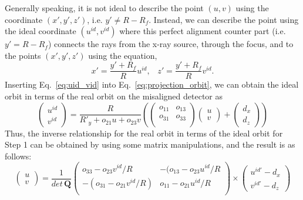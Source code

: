 Generally speaking, it is not ideal to describe the point $(u, v)$ using the coordinate $(x', y', z')$, i.e. $y' \neq R - R_f$.  Instead, we can describe the point using the ideal coordinate $(u^{id}, v^{id})$ where this perfect alignment counter part (i.e. $y' = R - R_f$) connects the rays from the x-ray source, through the focus, and to the points $(x', y', z')$ using the equation,
%
\begin{equation}
x' = \frac{y' + R_f}{R} u^{id}, \; \; \; z' = \frac{y' + R_f}{R} v^{id}.
\label{eq:uid_vid}
\end{equation}
%
Inserting Eq.~\ref{eq:uid_vid} into Eq.~\ref{eq:projection_orbit}, we can obtain the ideal orbit in terms of the real orbit on the misaligned detector as
%
\begin{equation}
\begin{pmatrix}
u^{id} \\
v^{id} 
\end{pmatrix} = \frac{R}{R'_y + o_{21}u + o_{23} v} 
\left(
\begin{pmatrix}
o_{11} & o_{13} \\
o_{31} & o_{33} \\
\end{pmatrix} 
\begin{pmatrix}
u \\
v
\end{pmatrix} + 
\begin{pmatrix}
d_x \\
d_z
\end{pmatrix}
\right)
\label{eq:ideal_orbit_matrix}
\end{equation}
%
Thus, the inverse relationship for the real orbit in terms of the ideal orbit for Step 1 can be obtained by using some matrix manipulations, and the result is as follows:
%
\begin{equation}
\begin{pmatrix}
u \\
v
\end{pmatrix} = \frac{1}{det \, \mathrm{\mathbf{Q}}}
\begin{pmatrix}
o_{33} - o_{23} v^{id}/R & -(o_{13} - o_{23} u^{id}/R \\
-(o_{31} - o_{21} v^{id}/R) & o_{11} - o_{21} u^{id}/R \\
\end{pmatrix}
\times 
\begin{pmatrix}
u^{id'} - d_x \\
v^{id'} - d_z
\end{pmatrix}
\label{eq:misaligned_orbit_matrix}
\end{equation}
